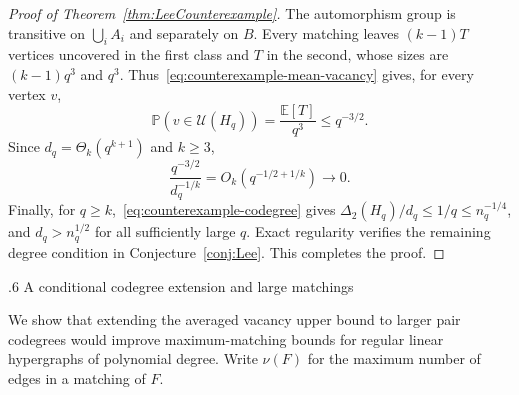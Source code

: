 \documentclass[11pt,reqno]{amsart}
\makeatletter
\numberwithin{equation}{section}
\renewcommand{\section}{\@startsection{section}{1}%
    \z@{1.3\linespacing\@plus.5\linespacing\@minus.2\linespacing}%
    {.6\linespacing}%
    {\normalfont\scshape\centering}}
\theoremstyle{plain}
\theoremstyle{definition}
\newcommand{\E}{\mathbb E}
\newcommand{\Prob}{\mathbb P}
\newcommand{\calU}{\mathcal U}
\makeatother
\begin{document}
\begin{proof}[Proof of Theorem~\ref{thm:LeeCounterexample}]
    The automorphism group is transitive on $\bigcup_i A_i$ and separately on $B$.
    Every matching leaves $(k-1)T$ vertices uncovered in the first class and $T$ in the second, whose sizes are $(k-1)q^3$ and $q^3$.
    Thus~\eqref{eq:counterexample-mean-vacancy} gives, for every vertex $v$,
    \begin{equation}\label{eq:counterexample-pointwise-vacancy}
        \Prob(v\in\calU(H_q))=\frac{\E[T]}{q^3}\le q^{-3/2}.
    \end{equation}
    Since $d_q=\Theta_k(q^{k+1})$ and $k\ge3$,
    \[
        \frac{q^{-3/2}}{d_q^{-1/k}}
        =O_k(q^{-1/2+1/k})\longrightarrow0.
    \]
    Finally, for $q\ge k$,~\eqref{eq:counterexample-codegree} gives $\Delta_2(H_q)/d_q\le1/q\le n_q^{-1/4}$, and $d_q>n_q^{1/2}$ for all sufficiently large $q$.
    Exact regularity verifies the remaining degree condition in Conjecture~\ref{conj:Lee}.
    This completes the proof.
\end{proof}


\section{A conditional codegree extension and large matchings}\label{sec:conditionallifting}

We show that extending the averaged vacancy upper bound to larger pair codegrees would improve maximum-matching bounds for regular linear hypergraphs of polynomial degree.
Write $\nu(F)$ for the maximum number of edges in a matching of $F$.
\end{document}
